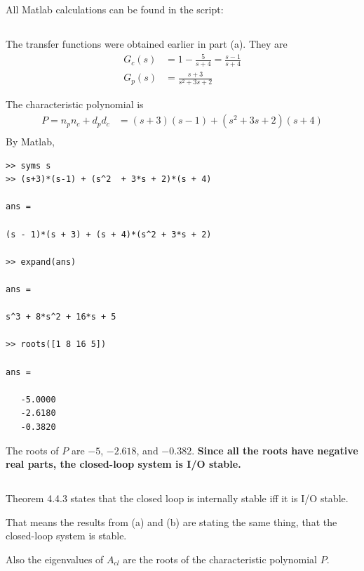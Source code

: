 All Matlab calculations can be found in the script:


\subsection{}

The transfer functions were obtained earlier in part (a). They are 
\begin{align*}
    G_c(s) &= 1 - \frac{5}{s+4}  = \frac{s-1}{s+4} \\
    G_p(s) &= \frac{s+3}{s^2 + 3s + 2}
\end{align*}

The characteristic polynomial is
\begin{align*}
    P = n_p n_c + d_p d_c &= (s+3)(s-1) + (s^2 + 3s + 2)(s+4) \\
\end{align*}
By Matlab,
\begin{verbatim}
>> syms s
>> (s+3)*(s-1) + (s^2  + 3*s + 2)*(s + 4)
 
ans =
 
(s - 1)*(s + 3) + (s + 4)*(s^2 + 3*s + 2)
 
>> expand(ans)
 
ans =
 
s^3 + 8*s^2 + 16*s + 5
 
>> roots([1 8 16 5])

ans =

   -5.0000
   -2.6180
   -0.3820
\end{verbatim}

The roots of $P$ are $-5$, $-2.618$, and $-0.382$. \textbf{Since all the roots have negative real parts, the closed-loop system is I/O stable.}

\subsection{}
Theorem 4.4.3 states that the closed loop is internally stable iff it is I/O stable. 

That means the results from (a) and (b) are stating the same thing, that the closed-loop system is stable.

Also the eigenvalues of $A_{cl}$ are the roots of the characteristic polynomial $P$.
